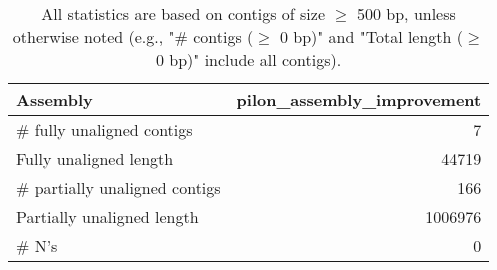 \documentclass[12pt,a4paper]{article}
\begin{document}
\begin{table}[ht]
\begin{center}
\caption{All statistics are based on contigs of size $\geq$ 500 bp, unless otherwise noted (e.g., "\# contigs ($\geq$ 0 bp)" and "Total length ($\geq$ 0 bp)" include all contigs).}
\begin{tabular}{|l*{1}{|r}|}
\hline
Assembly & pilon\_assembly\_improvement \\ \hline
\# fully unaligned contigs & 7 \\ \hline
Fully unaligned length & 44719 \\ \hline
\# partially unaligned contigs & 166 \\ \hline
Partially unaligned length & 1006976 \\ \hline
\# N's & 0 \\ \hline
\end{tabular}
\end{center}
\end{table}
\end{document}
